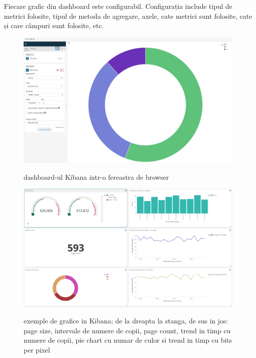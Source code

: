 \documentclass[12pt]{report}
\begin{document}
	Fiecare grafic din dashboard este configurabil. Configurația include tipul de metrici folosite, tipul de metoda de agregare, axele, cate metrici sunt folosite, cate și care câmpuri sunt folosite, etc.
	\begin{figure}
		\centering
		{\includegraphics[width=160mm]{kibana-chart-config.png}}
		\caption{dashboard-ul Kibana intr-o fereastra de browser}
	\end{figure}
	\begin{figure}
		\centering
		{\includegraphics[width=160mm]{dashboard.png}}
		\caption{exemple de grafice in Kibana; de la dreapta la stanga, de sus in jos: page size, intervale de numere de copii, page count, trend in timp cu numere de copii, pie chart cu numar de culor si trend in timp cu bits per pixel}
	\end{figure}
\end{document}
